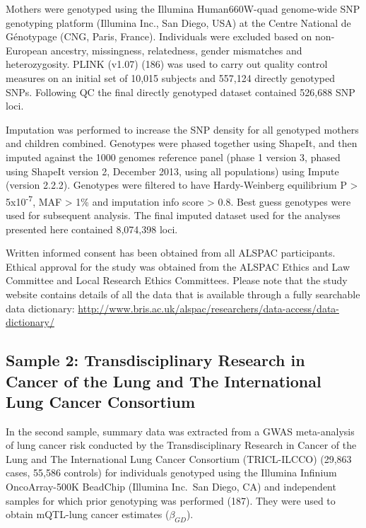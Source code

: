 \documentclass[11pt,oneside]{bristolthesis}
\begin{document}
Mothers were genotyped using the Illumina Human660W-quad genome-wide SNP genotyping platform (Illumina Inc., San Diego, USA) at the Centre National de Génotypage (CNG, Paris, France). Individuals were excluded based on non-European ancestry, missingness, relatedness, gender mismatches and heterozygosity. PLINK (v1.07) (186) was used to carry out quality control measures on an initial set of 10,015 subjects and 557,124 directly genotyped SNPs. Following QC the final directly genotyped dataset contained 526,688 SNP loci.

Imputation was performed to increase the SNP density for all genotyped mothers and children combined. Genotypes were phased together using ShapeIt, and then imputed against the 1000 genomes reference panel (phase 1 version 3, phased using ShapeIt version 2, December 2013, using all populations) using Impute (version 2.2.2). Genotypes were filtered to have Hardy-Weinberg equilibrium P \textgreater{} 5x10\textsuperscript{-7}, MAF \textgreater{} 1\% and imputation info score \textgreater{} 0.8. Best guess genotypes were used for subsequent analysis. The final imputed dataset used for the analyses presented here contained 8,074,398 loci.

Written informed consent has been obtained from all ALSPAC participants. Ethical approval for the study was obtained from the ALSPAC Ethics and Law Committee and Local Research Ethics Committees.
Please note that the study website contains details of all the data that is available through a fully searchable data dictionary: \url{http://www.bris.ac.uk/alspac/researchers/data-access/data-dictionary/}

\hypertarget{sample-2-transdisciplinary-research-in-cancer-of-the-lung-and-the-international-lung-cancer-consortium}{%
\subsection{Sample 2: Transdisciplinary Research in Cancer of the Lung and The International Lung Cancer Consortium}\label{sample-2-transdisciplinary-research-in-cancer-of-the-lung-and-the-international-lung-cancer-consortium}}

In the second sample, summary data was extracted from a GWAS meta-analysis of lung cancer risk conducted by the Transdisciplinary Research in Cancer of the Lung and The International Lung Cancer Consortium (TRICL-ILCCO) (29,863 cases, 55,586 controls) for individuals genotyped using the Illumina Infinium OncoArray-500K BeadChip (Illumina Inc.~San Diego, CA) and independent samples for which prior genotyping was performed (187). They were used to obtain mQTL-lung cancer estimates (\(\beta_{GD}\)).
\end{document}
